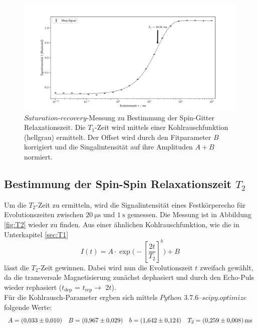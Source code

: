\begin{figure}[H]
    \centering
    \includegraphics[width=\textwidth]{Auswertung/T1.pdf}
    \caption{$\textit{Saturation-recovery}$-Messung zu Bestimmung der Spin-Gitter
    Relaxationszeit. Die $T_1$-Zeit wird mittels einer Kohlrauschfunktion (hellgrau)
    ermittelt. Der Offset wird durch den Fitparameter $B$ korrigiert und die
    Singalintensität auf ihre Amplituden $A+B$ normiert.}
    \label{fig:T1}
\end{figure}

\subsection{Bestimmung der Spin-Spin Relaxationszeit $T_2$}
\label{sec:T2}
Um die $T_2$-Zeit zu ermitteln, wird die Signalintensität eines Festkörperecho
für Evolutionszeiten zwischen $\SI{20}{\micro\second}$ und $\SI{1}{\second}$
gemessen. Die Messung ist in Abbildung \ref{fig:T2} wieder zu finden.
Aus einer ähnlichen Kohlrauschfunktion, wie die in Unterkapitel \ref{sec:T1}
\begin{equation}
    I(t) = A \cdot \exp\biggl(-\left[\frac{2t}{T_2} \right]^b
    \biggr) + B
\end{equation}
\noindent
lässt die $T_2$-Zeit gewinnen. Dabei wird nun die Evolutionszeit $t$ zweifach gewählt,
da die transversale Magnetisierung zunächst dephasiert und durch den Echo-Puls
wieder rephasiert ($t_{\text{dep}}$ = $t_{\text{rep}} \rightarrow $ 2$t$).\\
Für die Kohlrausch-Parameter ergben sich mittels $\textit{Python 3.7.6--scipy.optimize}$
folgende Werte:
\begin{equation*}
  A = \SI{0,033\pm0,010}{}
  \quad
  B = \SI{0,967\pm0,029}{}
  \quad
  b = \SI{1,642\pm0,124}{}
  \quad
  T_2 = \SI{0.259\pm0.008}{\milli\second}
\end{equation*}

